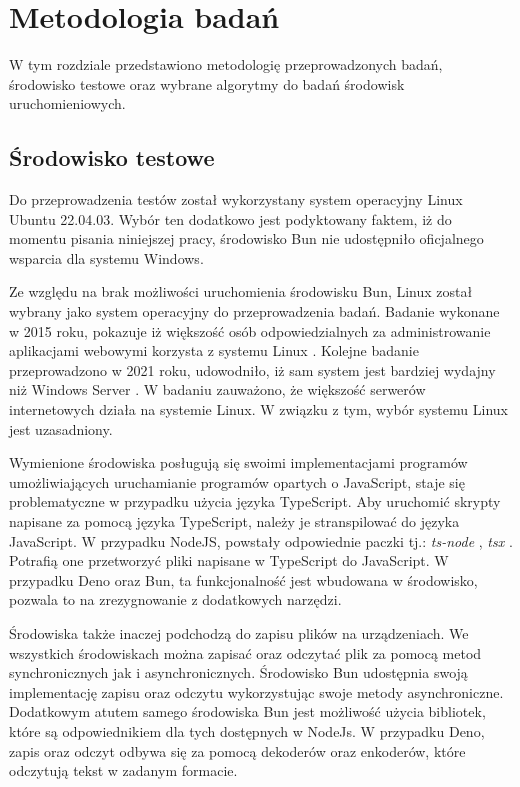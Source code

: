 \section{Metodologia badań}\label{sec:methodology}
W tym rozdziale przedstawiono metodologię przeprowadzonych badań, środowisko testowe oraz wybrane algorytmy do badań środowisk uruchomieniowych.

\subsection{Środowisko testowe}
Do przeprowadzenia testów został wykorzystany system operacyjny Linux Ubuntu 22.04.03. Wybór ten dodatkowo jest podyktowany faktem, iż do momentu pisania niniejszej pracy, środowisko Bun nie udostępniło oficjalnego wsparcia dla systemu Windows.

Ze względu na brak możliwości uruchomienia środowisku Bun, Linux został wybrany jako system operacyjny do przeprowadzenia badań. Badanie wykonane w 2015 roku, pokazuje iż większość osób odpowiedzialnych za administrowanie aplikacjami webowymi korzysta z systemu Linux \cite{performance_comparison_linux}. Kolejne badanie przeprowadzono w 2021 roku, udowodniło, iż sam system jest bardziej wydajny niż Windows Server \cite{web_server_performance}. W badaniu zauważono, że większość serwerów internetowych działa na systemie Linux. W związku z tym, wybór systemu Linux jest uzasadniony.

Wymienione środowiska posługują się swoimi implementacjami programów umożliwiających uruchamianie programów opartych o JavaScript, staje się problematyczne w przypadku użycia języka TypeScript. Aby uruchomić skrypty napisane za pomocą języka TypeScript, należy je stranspilować do języka JavaScript. W przypadku NodeJS, powstały odpowiednie paczki tj.: \textit{ts-node} \cite{ts_node}, \textit{tsx} \cite{tsx}. Potrafią one przetworzyć pliki napisane w TypeScript do JavaScript. W przypadku Deno oraz Bun, ta funkcjonalność jest wbudowana w środowisko, pozwala to na zrezygnowanie z dodatkowych narzędzi.

Środowiska także inaczej podchodzą do zapisu plików na urządzeniach. We wszystkich środowiskach można zapisać oraz odczytać plik za pomocą metod synchronicznych jak i asynchronicznych. Środowisko Bun udostępnia swoją implementację zapisu oraz odczytu wykorzystując swoje metody asynchroniczne. Dodatkowym atutem samego środowiska Bun jest możliwość użycia bibliotek, które są odpowiednikiem dla tych dostępnych w NodeJs. W przypadku Deno, zapis oraz odczyt odbywa się za pomocą dekoderów oraz enkoderów, które odczytują tekst w zadanym formacie.

